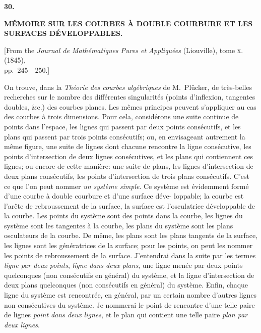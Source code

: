 \documentclass[11pt,a4paper]{book}
\begin{document}
\newpage
{}
\setcounter{page}{207}

\begin{center}
{\large\bfseries 30.}
\end{center}
\vspace{0.5em}
\begin{center}
{\large\bfseries M\'{E}MOIRE SUR LES COURBES \`{A} DOUBLE COURBURE ET LES\\[0.3em]
SURFACES D\'{E}VELOPPABLES.}
\end{center}
\vspace{0.5em}
\begin{center}
{[From the \textit{Journal de Math\'{e}matiques Pures et Appliqu\'{e}es} (Liouville), tome \textsc{x}. (1845),\\
pp.~245---250.]}
\end{center}
\vspace{1em}

On trouve, dans la \textit{Th\'{e}orie des courbes alg\'{e}briques} de M.~Pl\"{u}cker, de tr\`{e}s-belles
recherches sur le nombre des diff\'{e}rentes singularit\'{e}s (points d'inflexion, tangentes doubles,
\&c.) des courbes planes. Les m\^{e}mes principes peuvent s'appliquer au cas des courbes
\`{a} trois dimensions. Pour cela, consid\'{e}rons une suite continue de points dans l'espace,
les lignes qui passent par deux points cons\'{e}cutifs, et les plans qui passent par trois
points cons\'{e}cutifs; ou, en envisageant autrement la m\^{e}me figure, une suite de lignes
dont chacune rencontre la ligne cons\'{e}cutive, les points d'intersection de deux lignes
cons\'{e}cutives, et les plans qui contiennent ces lignes; ou encore de cette mani\`{e}re: une
suite de plans, les lignes d'intersection de deux plans cons\'{e}cutifs, les points d'intersection
de trois plans cons\'{e}cutifs. C'est ce que l'on peut nommer \textit{un syst\`{e}me simple}. Ce
syst\`{e}me est \'{e}videmment form\'{e} d'une courbe \`{a} double courbure et d'une surface d\'{e}ve-
loppable; la courbe est l'ar\^{e}te de rebroussement de la surface, la surface est l'osculatrice
d\'{e}veloppable de la courbe. Les points du syst\`{e}me sont des points dans la courbe, les
lignes du syst\`{e}me sont les tangentes \`{a} la courbe, les plans du syst\`{e}me sont les plans
osculateurs de la courbe. De m\^{e}me, les plans sont les plans tangents de la surface,
les lignes sont les g\'{e}n\'{e}ratrices de la surface; pour les points, on peut les nommer les
points de rebroussement de la surface. J'entendrai dans la suite par les termes \textit{ligne
par deux points}, \textit{ligne dans deux plans}, une ligne men\'{e}e par deux points quelconques
(non cons\'{e}cutifs en g\'{e}n\'{e}ral) du syst\`{e}me, et la ligne d'intersection de deux plans
quelconques (non cons\'{e}cutifs en g\'{e}n\'{e}ral) du syst\`{e}me. Enfin, chaque ligne du syst\`{e}me
est rencontr\'{e}e, en g\'{e}n\'{e}ral, par un certain nombre d'autres lignes non cons\'{e}cutives du
syst\`{e}me. Je nommerai le point de rencontre d'une telle paire de lignes \textit{point dans
deux lignes}, et le plan qui contient une telle paire \textit{plan par deux lignes}.
\end{document}
